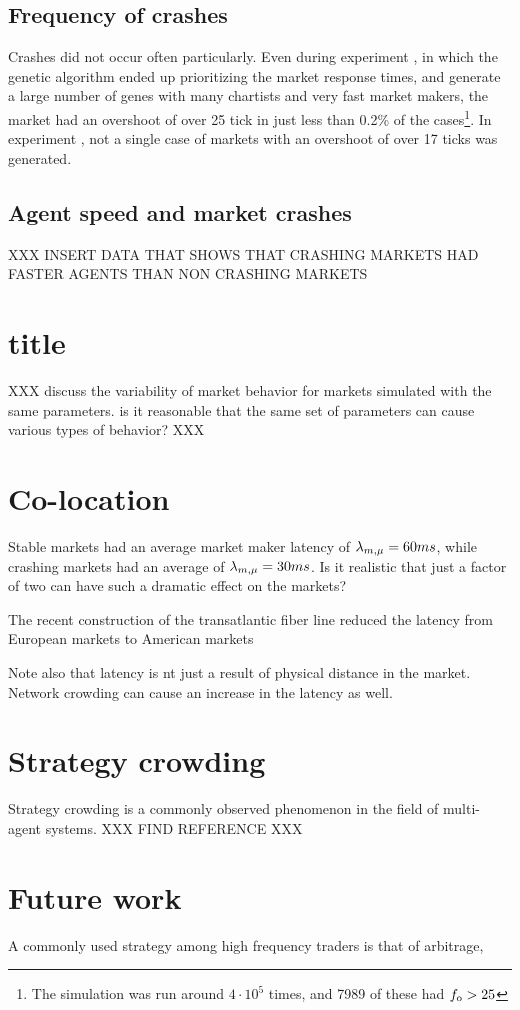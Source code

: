 \subsection{Frequency of crashes}

Crashes did not occur often particularly. Even during experiment \deleven, in which the genetic algorithm ended up prioritizing the market response times, and generate a large number of genes with many chartists and very fast market makers, the market had an overshoot of over 25 tick in just less than 0.2\% of the cases\footnote{The simulation was run around $4\cdot 10^5$ times, and 7989 of these had $f_\text{o} > 25$}. In experiment \dten, not a single case of markets with an overshoot of over 17 ticks was generated. 



\subsection{Agent speed and market crashes}
XXX INSERT DATA THAT SHOWS THAT CRASHING MARKETS HAD FASTER AGENTS THAN NON CRASHING MARKETS


\section{title}
XXX discuss the variability of market behavior for markets simulated with the same parameters. is it reasonable that the same set of parameters can cause various types of behavior? XXX 


\section{Co-location}
Stable markets had an average market maker latency of $\lambda_{m, \mu} = 60 ms$, while crashing markets had an average of $\lambda_{m, \mu} = 30 ms$. Is it realistic that just a factor of two can have such a dramatic effect on the markets? 

The recent construction of the transatlantic fiber line reduced the latency from European markets to American markets 

Note also that latency is nt just a result of physical distance in the market. Network crowding can cause an increase in the latency as well. 


\section{Strategy crowding}
Strategy crowding is a commonly observed phenomenon in the field of multi-agent systems. XXX FIND REFERENCE XXX

\section{Future work}
A commonly used strategy among high frequency traders is that of arbitrage, 


